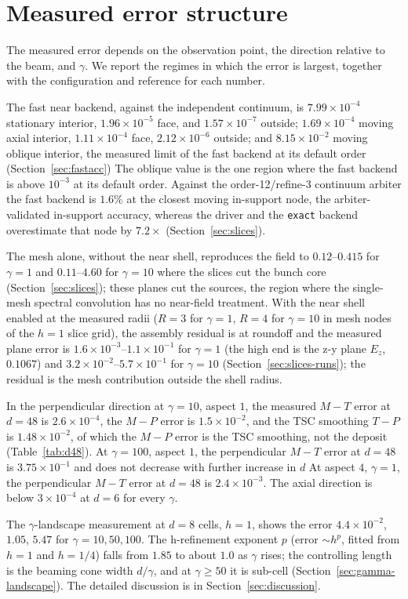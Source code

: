 \section{Measured error structure}
 \label{sec:limits}

 The measured error depends on the observation point, the direction relative
 to the beam, and $\gamma$. We report the regimes in which the error is
 largest, together with the configuration and reference for each number.

 The fast near backend, against the independent continuum, is
 $7.99\times10^{-4}$ stationary interior, $1.96\times10^{-5}$ face, and
 $1.57\times10^{-7}$ outside; $1.69\times10^{-4}$ moving axial interior,
 $1.11\times10^{-4}$ face, $2.12\times10^{-6}$ outside; and
  $8.15\times10^{-2}$ moving oblique interior, the measured limit of the fast
  backend at its default order (Section~\ref{sec:fastacc})
The oblique value is the one region where the fast
  backend is above $10^{-3}$ at its default order. Against the order-12/refine-3
  continuum arbiter the fast backend is $1.6\%$ at the closest moving in-support
   node, the arbiter-validated in-support accuracy, whereas the driver and the
   \texttt{exact} backend overestimate that node by $7.2\times$
   (Section~\ref{sec:slices}).

 The mesh alone, without the near shell, reproduces the field to
 $0.12$--$0.415$ for $\gamma=1$ and $0.11$--$4.60$ for $\gamma=10$ where the
 slices cut the bunch core (Section~\ref{sec:slices}); these planes cut the
 sources, the region where the single-mesh spectral convolution has no
 near-field treatment. With the near shell enabled at the measured radii
 ($R=3$ for $\gamma=1$, $R=4$ for $\gamma=10$ in mesh nodes of the $h=1$
 slice grid), the assembly residual is at roundoff and the measured plane
  error is $1.6\times10^{-3}$--$1.1\times10^{-1}$ for $\gamma=1$ (the high end
  is the z-y plane $E_z$, $0.1067$) and
 $3.2\times10^{-2}$--$5.7\times10^{-1}$ for $\gamma=10$
 (Section~\ref{sec:slices-runs}); the residual is the mesh contribution
 outside the shell radius.

  In the perpendicular direction at $\gamma=10$, aspect $1$, the measured
  $M\!-\!T$ error at $d=48$ is $2.6\times10^{-4}$, the $M\!-\!P$ error is
  $1.5\times10^{-2}$, and the TSC smoothing $T\!-\!P$ is
  $1.48\times10^{-2}$, of which the $M\!-\!P$ error is the TSC smoothing, not
  the deposit (Table~\ref{tab:d48}).
 At $\gamma=100$, aspect $1$, the perpendicular $M\!-\!T$ error at $d=48$ is
 $3.75\times10^{-1}$ and does not decrease with further increase in $d$
At aspect $4$, $\gamma=1$, the perpendicular $M\!-\!T$ error
 at $d=48$ is $2.4\times10^{-3}$. The axial direction is below
 $3\times10^{-4}$ at $d=6$ for every $\gamma$.

  The $\gamma$-landscape measurement at $d=8$ cells, $h=1$, shows the error
  $4.4\times10^{-2}$, $1.05$, $5.47$ for $\gamma=10,50,100$. The h-refinement
  exponent $p$ (error $\sim h^p$, fitted from $h=1$ and $h=1/4$) falls from
  $1.85$ to about $1.0$ as $\gamma$ rises; the controlling length is the
  beaming cone width $d/\gamma$, and at $\gamma\ge50$ it is sub-cell
  (Section~\ref{sec:gamma-landscape}). The detailed discussion is
  in Section~\ref{sec:discussion}.
